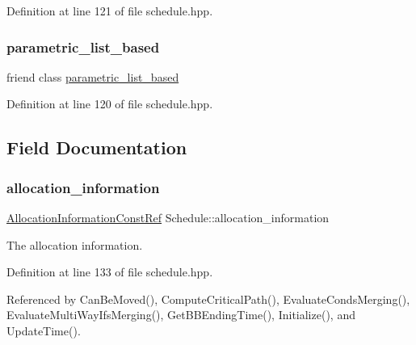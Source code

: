 Definition at line 121 of file schedule.\+hpp.

\mbox{\label{classSchedule_a44083050f827fe080f60a4b79b97bc93}} 
\subsubsection{\texorpdfstring{parametric\+\_\+list\+\_\+based}{parametric\_list\_based}}
{\footnotesize\ttfamily friend class \hyperlink{classparametric__list__based}{parametric\+\_\+list\+\_\+based}\hspace{0.3cm}{\ttfamily [friend]}}



Definition at line 120 of file schedule.\+hpp.



\subsection{Field Documentation}
\mbox{\label{classSchedule_a864b9407b1dcf3d37b69366be6838e1d}} 
\subsubsection{\texorpdfstring{allocation\+\_\+information}{allocation\_information}}
{\footnotesize\ttfamily \hyperlink{allocation__information_8hpp_a54287618a63bf87e31ddb17ba01e7ca7}{Allocation\+Information\+Const\+Ref} Schedule\+::allocation\+\_\+information\hspace{0.3cm}{\ttfamily [private]}}



The allocation information. 



Definition at line 133 of file schedule.\+hpp.



Referenced by Can\+Be\+Moved(), Compute\+Critical\+Path(), Evaluate\+Conds\+Merging(), Evaluate\+Multi\+Way\+Ifs\+Merging(), Get\+B\+B\+Ending\+Time(), Initialize(), and Update\+Time().

\mbox{\label{classSchedule_a9c313308e88d070672b9466ebae89d32}} 

